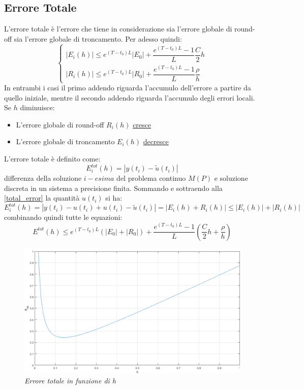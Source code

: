 \subsection{Errore Totale}
L'errore totale è l'errore che tiene in considerazione sia l'errore globale di round-off sia l'errore globale di troncamento. Per adesso quindi:
\begin{equation*}
	\begin{cases}
		|E_i(h)| \leq e^{(T-t_0)L}|E_0| + \dfrac{e^{(T-t_0)L}-1}{L}\dfrac{C}{2}h \\[0.4cm]
		|R_i(h)| \leq e^{(T-t_0)L}|R_0| + \dfrac{e^{(T-t_0)L}-1}{L}\dfrac{\rho}{h} 
	\end{cases}
\end{equation*}
In entrambi i casi il primo addendo riguarda l'accumulo dell'errore a partire da quello iniziale, mentre il secondo addendo riguarda l'accumulo degli errori locali. Se $h$ diminuisce:
\begin{itemize}
	\item L'errore globale di round-off $R_i(h)$ \underline{cresce}
	\item L'errore globale di troncamento $E_i(h)$ \underline{decresce}
\end{itemize}
L'errore totale è definito come:
\begin{equation}
	\label{total_error}
	E^{tot}_i(h) = |y(t_i) - \tilde{u}(t_i)|
\end{equation}
differenza della soluzione $i-esima$ del problema continuo $M(P)$ e soluzione discreta in un sistema a precisione finita. Sommando e sottraendo alla \ref{total_error} la quantità $u(t_i)$ si ha:
\begin{equation}
	\label{e_tot}
E^{tot}_i(h) = |y(t_i) - u(t_i) + u(t_i) - \tilde{u}(t_i)| = |E_i(h) + R_i(h)| \leq |E_i(h)| + |R_i(h)|
\end{equation}
combinando quindi tutte le equazioni:
\begin{equation}
	E^{tot}(h) \leq e^{(T-t_0)L}\left(|E_0|+|R_0|\right) + \dfrac{e^{(T-t_0)L}-1}{L}\left(\dfrac{C}{2}h + \dfrac{\rho}{h}\right)
\end{equation}
\begin{figure}[H]
	\centering
	\includegraphics[width=\textwidth]{matlab/errore_totale.png}
	\caption{\textit{Errore totale in funzione di h}}
	\label{e_tot_fig}
\end{figure}
